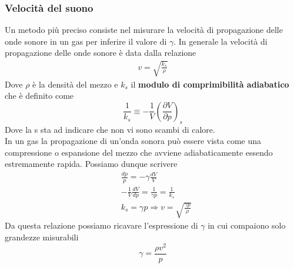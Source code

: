 \documentclass[
10pt, %
a4paper, %
oneside, %
headinclude,footinclude, %
BCOR5mm, %
]{scrartcl}
\begin{document}
\subsubsection{Velocità del suono}
Un metodo più preciso consiste nel misurare la velocità di propagazione delle onde sonore
in un gas per inferire il valore di $\gamma$. In generale la velocità di propagazione delle onde sonore è data dalla relazione
\begin{align*}
	v = \sqrt{\frac{k_s}{\rho}}
\end{align*}
Dove $\rho$ è la densità del mezzo e $k_s$ il \textbf{modulo di comprimibilità adiabatico} che è definito come \[\frac{1}{k_s}\equiv -\frac{1}{V}\left(\frac{\partial V}{\partial p}\right)_s\]
Dove la s sta ad indicare che non vi sono scambi di calore.\\ In un gas la propagazione di un'onda sonora può essere vista come una compressione o espansione del mezzo che avviene adiabaticamente essendo estremamente rapida. Possiamo dunque scrivere
\begin{align*}
	&\frac{dp}{p} = -\gamma \frac{dV}{V}\\
	&-\frac{1}{V}\frac{dV}{dp}=\frac{1}{\gamma p} = \frac{1}{k_s}\\
	&k_s = \gamma p \Rightarrow v = \sqrt{\frac{\gamma p}{\rho}}
\end{align*}
Da questa relazione possiamo ricavare l'espressione di $\gamma$ in cui compaiono solo grandezze misurabili \[\gamma =\frac{ \rho v^2}{p}\]
\end{document}

